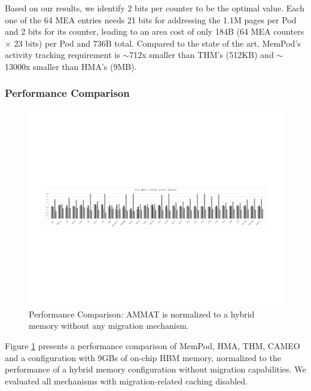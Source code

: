 Based on our results, we identify 2 bits per counter to be the optimal value. Each one of the 64 MEA entries needs 21 bits for addressing the 1.1M pages per Pod and 2 bits for its counter, leading to an area cost of only 184B (64 MEA counters $\times$ 23 bits) per Pod and 736B total. Compared to the state of the art, MemPod's activity tracking requirement is $\sim$712x smaller than THM's (512KB) and $\sim$13000x smaller than HMA's (9MB).

\subsubsection{Performance Comparison}
\label{sub:performance}

\begin{figure}[t]
  \includegraphics[width=\textwidth]{figures/revised/new/comparison_no_cache.pdf}
  \caption{Performance Comparison: AMMAT is normalized to a hybrid memory without any migration mechanism.}
  \label{fig:performance}
\end{figure}

Figure \ref{fig:performance} presents a performance comparison of MemPod, HMA, THM, CAMEO and a configuration with 9GBs of on-chip HBM memory, normalized to the performance of a hybrid memory configuration without migration capabilities. We evaluated all mechanisms with migration-related caching disabled. 

